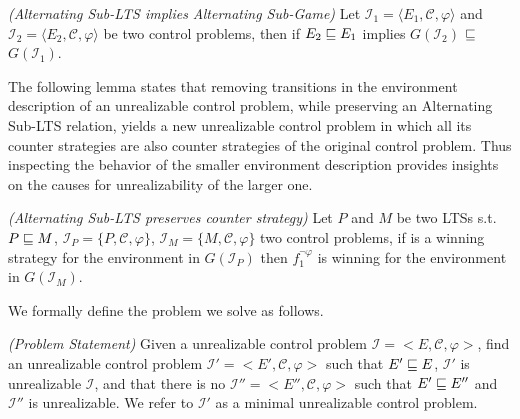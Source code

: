 \begin{lemma}\emph{(Alternating Sub-LTS implies Alternating Sub-Game)}\label{theorem:alternating-sub-game}
Let $\mathcal{I}_1 = \langle E_1, \mathcal{C}, \varphi \rangle$ and
$\mathcal{I}_2 = \langle E_2, \mathcal{C}, \varphi \rangle$ be two
control problems, then if $E_2 \sqsubseteq E_1$ implies $G(\mathcal{I}_2)$
$\sqsubseteq$ $G(\mathcal{I}_1)$.
\end{lemma}

The following lemma states that removing transitions in the environment description of an unrealizable control problem, while preserving an Alternating Sub-LTS relation, yields a new unrealizable control problem in which all its counter strategies are also counter strategies of the original control problem. Thus inspecting the behavior of the smaller environment description provides insights on the causes for unrealizability of the larger one.  

\begin{lemma}\emph{(Alternating Sub-LTS preserves counter strategy)}\label{theorem:theo.preserves-non-realizability}
Let $P$ and $M$ be two LTSs s.t. $P \sqsubseteq M$, 
$\mathcal{I}_P = \lbrace P, \mathcal{C}, \varphi \rbrace$,
$\mathcal{I}_M = \lbrace M, \mathcal{C}, \varphi \rbrace$
two control problems, if
 \counterS is a winning strategy for
the environment in $G(\mathcal{I}_P)$ 
then $f_1^{\neg \varphi}$ is winning for the environment in
$G(\mathcal{I}_M)$.
\end{lemma}

We formally define the problem we solve as follows.

\begin{definition}\label{def:ProblemStatement}\emph{(Problem Statement)}
Given a unrealizable control problem $\mathcal{I} = <E, \mathcal{C}, \varphi>$, find an unrealizable control problem $\mathcal{I'} = <E', \mathcal{C}, \varphi>$ such that $E' \sqsubseteq E$, $\mathcal{I'}$ is unrealizable $\mathcal{I}$, and that there is no $\mathcal{I''} = <E'', \mathcal{C}, \varphi>$ such that $E' \sqsubseteq E''$ and $\mathcal{I''}$ is unrealizable. We refer to $\mathcal{I'}$ as a minimal unrealizable control problem.
\end{definition}

